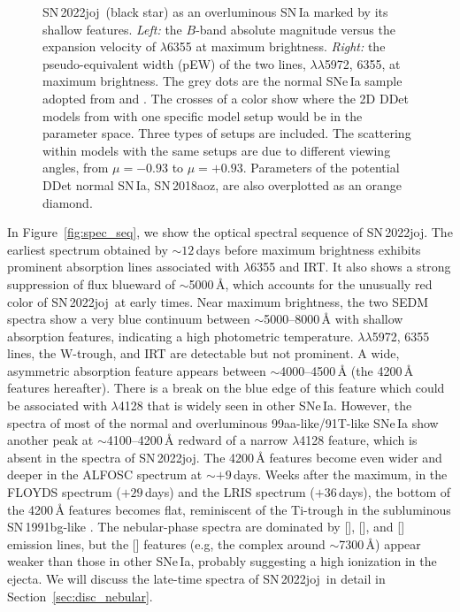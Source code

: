 \documentclass[twocolumn]{aastex631}
\newcommand{\sn}{SN\,2022joj}
\begin{document}
\begin{CJK*}{UTF8}{gbsn}
\begin{figure}
    \caption{\sn\ (black star) as an overluminous SN\,Ia marked by its shallow  features. \textit{Left:} the $B$-band absolute magnitude versus the expansion velocity of  $\lambda$6355 at maximum brightness. \textit{Right:} the pseudo-equivalent width (pEW) of the two  lines,  $\lambda\lambda$5972, 6355, at maximum brightness. The grey dots are the normal SNe\,Ia sample adopted from \citet{Zheng_2018} and \citet{Burrow_2020}. The crosses of a color show where the 2D DDet models from \citet{Shen_2D_2021} with one specific model setup would be in the parameter space. Three types of setups are included. The scattering within models with the same setups are due to different viewing angles, from $\mu = -0.93$ to $\mu=+0.93$. Parameters of the potential DDet normal SN\,Ia, SN\,2018aoz, are also overplotted as an orange diamond.}
    \label{fig:phase_space}
\end{figure}

In Figure~\ref{fig:spec_seq}, we show the optical spectral sequence of \sn. The earliest spectrum obtained by \citet{Newsome_2022TNSCR} $\sim$$12$\,days before maximum brightness exhibits prominent absorption lines associated with  $\lambda$6355 and  IRT. It also shows a strong suppression of flux blueward of $\sim$5000\,\r{A}, which accounts for the unusually red color of \sn\ at early times. Near maximum brightness, the two SEDM spectra show a very blue continuum between $\sim$5000--8000\,\r{A} with shallow absorption features, indicating a high photometric temperature.  $\lambda\lambda$5972, 6355 lines, the  W-trough, and  IRT are detectable but not prominent. A wide, asymmetric absorption feature appears between $\sim$4000--4500\,\r{A} (the 4200\,\r{A} features hereafter). There is a break on the blue edge of this feature which could be associated with  $\lambda$4128 that is widely seen in other SNe\,Ia. However, the spectra of most of the normal and overluminous 99aa-like/91T-like SNe\,Ia show another peak at $\sim$4100--4200\,\r{A} redward of a narrow  $\lambda$4128 feature, which is absent in the spectra of \sn. The 4200\,\r{A} features become even wider and deeper in the ALFOSC spectrum at $\sim$$+9$\,days. Weeks after the maximum, in the FLOYDS spectrum ($+29$\,days) and the LRIS spectrum ($+36$\,days), the bottom of the 4200\,\r{A} features becomes flat, reminiscent of the Ti-trough in the subluminous SN\,1991bg-like \citep[91bg-like;][]{Filippenko_91bg_1992,Leibundgut_91bg_1993}. The nebular-phase spectra are dominated by [], [], and [] emission lines, but the [] features (e.g, the complex around $\sim$7300\,\r{A}) appear weaker than those in other SNe\,Ia, probably suggesting a high ionization in the ejecta. We will discuss the late-time spectra of \sn\ in detail in Section~\ref{sec:disc_nebular}.


\end{CJK*}
\end{document}
